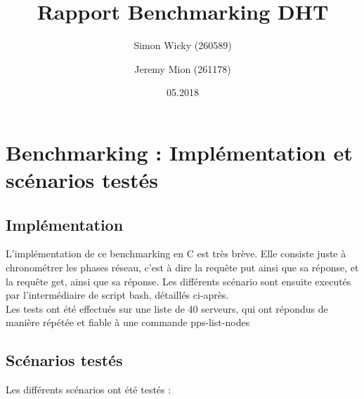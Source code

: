 \documentclass{article}
\author{Simon Wicky (260589) \and Jeremy Mion (261178)}
\title{Rapport Benchmarking DHT}
\date{05.2018}
\begin{document}
\maketitle
{}

\section{Benchmarking : Implémentation et scénarios testés}

\subsection{Implémentation}
L'implémentation de ce benchmarking en C est très brève. Elle consiste juste à chronométrer les phases réseau, c'est à dire la requête put ainsi que sa réponse, et la requête get, ainsi que sa réponse. Les différents scénario sont ensuite executés par l'intermédiaire de script bash, détaillés ci-après. \\
Les tests ont été effectués sur une liste de 40 serveurs, qui ont répondus de manière répétée et fiable à une commande pps-list-nodes

\subsection{Scénarios testés}
Les différents scénarios ont été testés :
\end{document}
